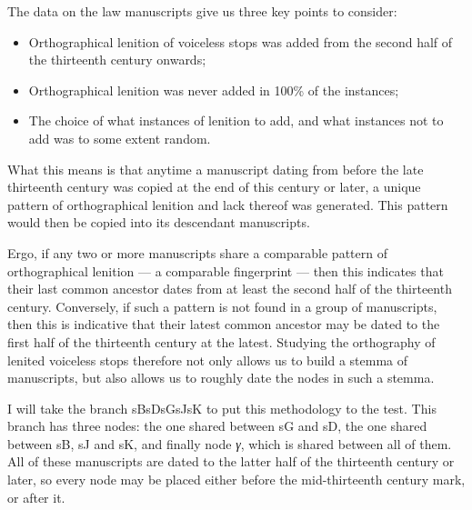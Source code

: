 The data on the law manuscripts give us three key points to consider:
\begin{itemize}
\item Orthographical lenition of voiceless stops was added from the second half of the thirteenth century onwards;
\item Orthographical lenition was never added in 100\% of the instances;
\item The choice of what instances of lenition to add, and what instances not to add was to some extent random.
\end{itemize}

What this means is that anytime a manuscript dating from before the late thirteenth century was copied at the end of this century or later, a unique pattern of orthographical lenition and lack thereof was generated. This pattern would then be copied into its descendant manuscripts.

Ergo, if any two or more manuscripts share a comparable pattern of orthographical lenition --- a comparable fingerprint --- then this indicates that their last common ancestor dates from at least the second half of the thirteenth century. Conversely, if such a pattern is not found in a group of manuscripts, then this is indicative that their latest common ancestor may be dated to the first half of the thirteenth century at the latest. Studying the orthography of lenited voiceless stops therefore not only allows us to build a stemma of manuscripts, but also allows us to roughly date the nodes in such a stemma.


I will take the branch \gls{sB}\gls{sD}\gls{sG}\gls{sJ}\gls{sK}
to put this methodology to the test. This branch has three nodes: the one shared between \gls{sG} and \gls{sD}, the one shared between \gls{sB}, \gls{sJ} and \gls{sK}, and finally node \textit{γ}, which is shared between all of them. All of these manuscripts are dated to the latter half of the thirteenth century or later, so every node may be placed either before the mid-thirteenth century mark, or after it.

